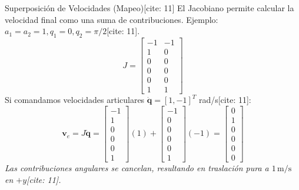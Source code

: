 \documentclass[aspectratio=169, xcolor={table,xcdraw}]{beamer}
\begin{document}
\begin{frame}{Superposición de Velocidades (Mapeo)[cite: 11]}
    El Jacobiano permite calcular la velocidad final como una suma de contribuciones.
    Ejemplo: $a_1=a_2=1, q_1=0, q_2=\pi/2$[cite: 11].
    \begin{equation*}
        J = \begin{bmatrix}
        -1 & -1 \\
        1 & 0 \\
        0 & 0 \\
        0 & 0 \\
        0 & 0 \\
        1 & 1
        \end{bmatrix}
    \end{equation*}
    Si comandamos velocidades articulares $\dot{\mathbf{q}} = [1, -1]^T$ rad/s[cite: 11]:
    \begin{equation*}
        \mathbf{v}_e = J \dot{\mathbf{q}} = \begin{bmatrix} -1 \\ 1 \\ 0 \\ 0 \\ 0 \\ 1 \end{bmatrix}(1) + \begin{bmatrix} -1 \\ 0 \\ 0 \\ 0 \\ 0 \\ 1 \end{bmatrix}(-1) = \boxed{ \begin{bmatrix} 0 \\ 1 \\ 0 \\ 0 \\ 0 \\ 0 \end{bmatrix} }
    \end{equation*}
    \textit{Las contribuciones angulares se cancelan, resultando en traslación pura a $1 \, \mathrm{m/s}$ en $+y$[cite: 11].}
\end{frame}
\end{document}
